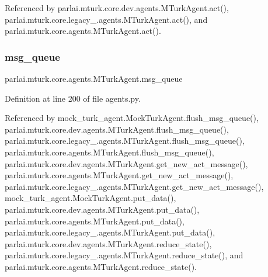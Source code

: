 Referenced by parlai.\+mturk.\+core.\+dev.\+agents.\+M\+Turk\+Agent.\+act(), parlai.\+mturk.\+core.\+legacy\+\_.\+agents.\+M\+Turk\+Agent.\+act(), and parlai.\+mturk.\+core.\+agents.\+M\+Turk\+Agent.\+act().

\mbox{\label{classparlai_1_1mturk_1_1core_1_1agents_1_1MTurkAgent_a789680932f68f3bef45e3ee19d0dc7aa}} 
\subsubsection{\texorpdfstring{msg\+\_\+queue}{msg\_queue}}
{\footnotesize\ttfamily parlai.\+mturk.\+core.\+agents.\+M\+Turk\+Agent.\+msg\+\_\+queue}



Definition at line 200 of file agents.\+py.



Referenced by mock\+\_\+turk\+\_\+agent.\+Mock\+Turk\+Agent.\+flush\+\_\+msg\+\_\+queue(), parlai.\+mturk.\+core.\+dev.\+agents.\+M\+Turk\+Agent.\+flush\+\_\+msg\+\_\+queue(), parlai.\+mturk.\+core.\+legacy\+\_.\+agents.\+M\+Turk\+Agent.\+flush\+\_\+msg\+\_\+queue(), parlai.\+mturk.\+core.\+agents.\+M\+Turk\+Agent.\+flush\+\_\+msg\+\_\+queue(), parlai.\+mturk.\+core.\+dev.\+agents.\+M\+Turk\+Agent.\+get\+\_\+new\+\_\+act\+\_\+message(), parlai.\+mturk.\+core.\+agents.\+M\+Turk\+Agent.\+get\+\_\+new\+\_\+act\+\_\+message(), parlai.\+mturk.\+core.\+legacy\+\_.\+agents.\+M\+Turk\+Agent.\+get\+\_\+new\+\_\+act\+\_\+message(), mock\+\_\+turk\+\_\+agent.\+Mock\+Turk\+Agent.\+put\+\_\+data(), parlai.\+mturk.\+core.\+dev.\+agents.\+M\+Turk\+Agent.\+put\+\_\+data(), parlai.\+mturk.\+core.\+agents.\+M\+Turk\+Agent.\+put\+\_\+data(), parlai.\+mturk.\+core.\+legacy\+\_.\+agents.\+M\+Turk\+Agent.\+put\+\_\+data(), parlai.\+mturk.\+core.\+dev.\+agents.\+M\+Turk\+Agent.\+reduce\+\_\+state(), parlai.\+mturk.\+core.\+legacy\+\_.\+agents.\+M\+Turk\+Agent.\+reduce\+\_\+state(), and parlai.\+mturk.\+core.\+agents.\+M\+Turk\+Agent.\+reduce\+\_\+state().

\mbox{\label{classparlai_1_1mturk_1_1core_1_1agents_1_1MTurkAgent_a027f6f120329eca8a49893e0071042b9}} 
